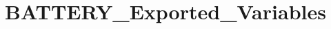 \hypertarget{group___b_a_t_t_e_r_y___exported___variables}{}\section{B\+A\+T\+T\+E\+R\+Y\+\_\+\+Exported\+\_\+\+Variables}
\label{group___b_a_t_t_e_r_y___exported___variables}
